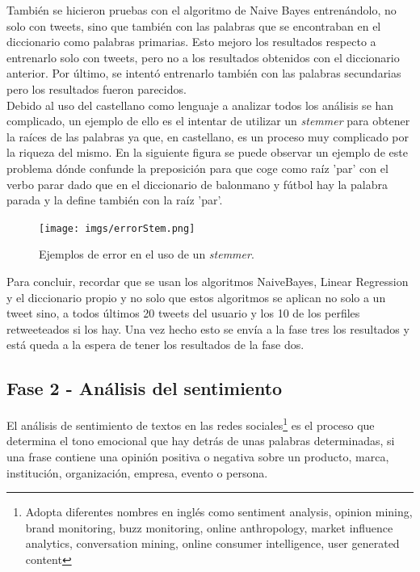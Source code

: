 \documentclass[../all.tex]{subfiles}
\begin{document}
	\newpage
	También se hicieron pruebas con el algoritmo de Naive Bayes entrenándolo, no solo con tweets, sino que también con las palabras que se encontraban en el diccionario como palabras primarias. Esto mejoro los resultados respecto a entrenarlo solo con tweets, pero no a los resultados obtenidos con el diccionario anterior. Por último, se intentó entrenarlo también con las palabras secundarias pero los resultados fueron parecidos.\\
	
	Debido al uso del castellano como lenguaje a analizar todos los análisis se han complicado, un ejemplo de ello es el intentar de utilizar un \textit{stemmer} para obtener la raíces de las palabras ya que, en castellano, es un proceso muy complicado por la riqueza del mismo. En la siguiente figura se puede observar un ejemplo de este problema dónde confunde la preposición para que coge como raíz 'par' con el verbo parar dado que en el diccionario de balonmano y fútbol hay la palabra parada y la define también con la raíz 'par'.\\
	
	 \begin{figure}[H]
	 	\centering
	 	\texttt{[image: imgs/errorStem.png]}
	 	\caption{Ejemplos de error en el uso de un \textit{stemmer}.}
	 \end{figure}
	
	Para concluir, recordar que se usan los algoritmos NaiveBayes, Linear Regression y el diccionario propio y no solo que estos algoritmos se aplican no solo a un tweet sino, a todos últimos 20 tweets del usuario y los 10 de los perfiles retweeteados si los hay. Una vez hecho esto se envía a la fase tres los resultados y está queda a la espera de tener los resultados de la fase dos.
	
	
\newpage
\subsection{Fase 2 - Análisis del sentimiento}
    El análisis de sentimiento de textos en las redes sociales\footnote{Adopta diferentes nombres en inglés como sentiment analysis, opinion mining, brand monitoring, buzz monitoring, online anthropology, market influence analytics, conversation mining, online consumer intelligence, user generated content} es el proceso que determina el tono emocional que hay detrás de unas palabras determinadas, si una frase contiene una opinión positiva o negativa sobre un producto, marca, institución, organización, empresa, evento o persona.\\
\end{document}
